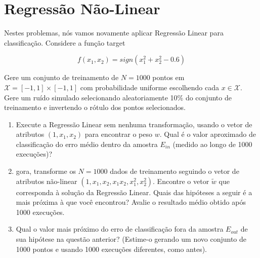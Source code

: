 \section{Regressão Não-Linear}

Nestes problemas, nós vamos novamente aplicar Regressão Linear para classificação. Considere a função target

$$f(x_1,x_2) = sign(x_1^2 + x_2^2 - 0.6) $$

Gere um conjunto de treinamento de $N = 1000$ pontos em $\mathcal{X} = [-1, 1] \times [-1, 1]$ com probabilidade uniforme escolhendo cada $x \in \mathcal{X}$. Gere um ruído simulado selecionando aleatoriamente 10\% do conjunto de treinamento e invertendo o rótulo dos pontos selecionados.

\begin{enumerate}
    \item Execute a Regressão Linear sem nenhuma transformação, usando o vetor de atributos $(1, x_1, x_2)$ para encontrar o peso $w$. Qual é o valor aproximado de classificação do erro médio dentro da amostra $E_{in}$ (medido ao longo de 1000 execuções)?
    
    \item gora, transforme os $N = 1000$ dados de treinamento seguindo o vetor de atributos não-linear $(1, x_1, x_2, x_1x_2, x_1^2, x_2^2)$. Encontre o vetor $\tilde{w}$ que corresponda à solução da Regressão Linear. Quais das hipóteses a seguir é a mais próxima à que você encontrou? Avalie o resultado médio obtido após 1000 execuções.
    
    \item Qual o valor mais próximo do erro de classificação fora da amostra $E_{out}$ de sua hipótese na questão anterior? (Estime-o gerando um novo conjunto de 1000 pontos e usando 1000 execuções diferentes, como antes).
\end{enumerate}

